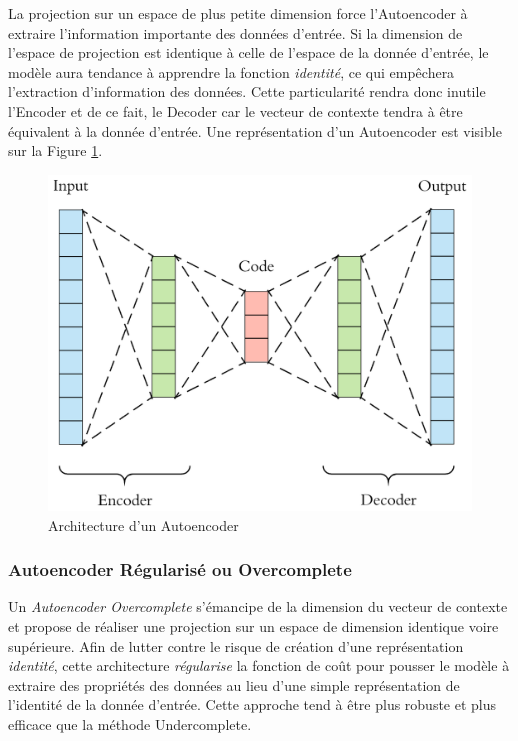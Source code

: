 \noindent La projection sur un espace de plus petite dimension force l'Autoencoder à extraire l'information importante des données d'entrée. Si la dimension de l'espace de projection est identique à celle de l'espace de la donnée d'entrée, le modèle aura tendance à apprendre la fonction \textit{identité}, ce qui empêchera l'extraction d'information des données. Cette particularité rendra donc inutile l'Encoder et de ce fait, le Decoder car le vecteur de contexte tendra à être équivalent à la donnée d'entrée. Une représentation d'un Autoencoder est visible sur la Figure \ref{autoencoder}.

\begin{figure}
    \centering
    \includegraphics[scale=0.2]{./tex/encoder-decoder-network/autoencoder.png}
    \caption{Architecture d'un Autoencoder}
    \label{autoencoder}
\end{figure}

\subsubsection{Autoencoder Régularisé ou Overcomplete}
Un \textit{Autoencoder Overcomplete} s'émancipe de la dimension du vecteur de contexte et propose de réaliser une projection sur un espace de dimension identique voire supérieure. Afin de lutter contre le risque de création d'une représentation \textit{identité}, cette architecture \textit{régularise} la fonction de coût pour pousser le modèle à extraire des propriétés des données au lieu d'une simple représentation de l'identité de la donnée d'entrée. Cette approche tend à être plus robuste et plus efficace que la méthode Undercomplete.\\

